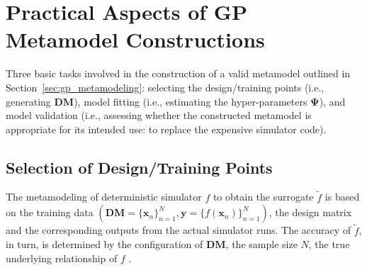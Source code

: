 \newpage
\section{Practical Aspects of GP Metamodel Constructions}\label{sec:gp_construction}

Three basic tasks involved in the construction of a valid metamodel outlined in Section~\ref{sec:gp_metamodeling}:
selecting the design/training points (i.e., generating $\mathbf{DM}$),
model fitting (i.e., estimating the hyper-parameters $\boldsymbol{\Psi}$),
and model validation (i.e., assessing whether the constructed metamodel is appropriate for its intended use: to replace the expensive simulator code).

\subsection{Selection of Design/Training Points}\label{sub:gp_design}

The metamodeling of deterministic simulator $f$ to obtain the surrogate $\tilde{f}$ is based on the training data $\left(\mathbf{DM} = \{\mathbf{x}_n\}_{n=1}^N, \mathbf{y} = \{f(\mathbf{x}_{n})\}_{n=1}^N\right)$, 
the design matrix and the corresponding outputs from the actual simulator runs.
The accuracy of $\tilde{f}$, in turn, is determined by the configuration of $\mathbf{DM}$,
the sample size $N$, the true underlying relationship of $f$ \cite{Ginsbourger2010}.

